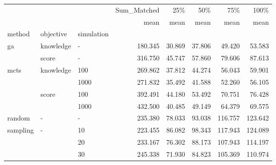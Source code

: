 \begin{tabular}{lllrrrrr}
\toprule
         &   &    & Sum\_Matched &    25\% &    50\% &     75\% &    100\% \\
         &   &    &        mean &   mean &   mean &    mean &    mean \\
method & objective & simulation &             &        &        &         &         \\
\midrule
ga & knowledge & - &     180.345 & 30.869 & 37.806 &  49.420 &  53.583 \\
         & score & - &     316.750 & 45.747 & 57.860 &  79.606 &  87.613 \\
mcts & knowledge & 100 &     269.862 & 37.812 & 44.274 &  56.043 &  59.901 \\
         &   & 1000 &     271.832 & 35.492 & 41.588 &  52.260 &  56.105 \\
         & score & 100 &     392.491 & 44.180 & 53.492 &  70.751 &  76.428 \\
         &   & 1000 &     432.500 & 40.485 & 49.149 &  64.379 &  69.575 \\
random & - & - &     235.380 & 78.033 & 93.038 & 116.757 & 123.642 \\
sampling & - & 10 &     223.455 & 86.082 & 98.343 & 117.943 & 124.089 \\
         &   & 20 &     233.167 & 76.302 & 88.173 & 107.943 & 114.197 \\
         &   & 30 &     245.338 & 71.930 & 84.823 & 105.369 & 110.974 \\
\bottomrule
\end{tabular}
